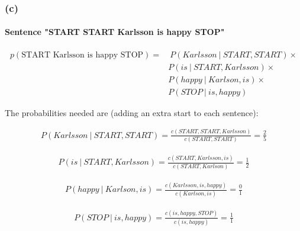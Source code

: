 \documentclass{article}
\newcommand\given[1][]{\:#1\vert\:}
\begin{document}
\subsubsection*{(c)}

\paragraph{Sentence "START START Karlsson is happy STOP"}

\begin{equation*}
    \begin{split}
    p(\text{START Karlsson is happy STOP}) =&\ P(Karlsson \given START, START) \times \\
    & P(is \given START, Karlsson) \times \\
    & P(happy \given Karlson, is) \times \\
    & P(STOP \given is, happy)
    \end{split}
\end{equation*}

The probabilities needed are (adding an extra start to each sentence):

\begin{equation*}
    \begin{split}
    P(Karlsson \given START, START) = \frac{c(START, START, Karlsson)}{ c(START, START)} = \frac{2}{5}
    \end{split}
\end{equation*}

\begin{equation*}
    \begin{split}
    P(is \given START, Karlsson) = \frac{c(START, Karlsson, is)}{ c(START, Karlson)} = \frac{1}{2}
    \end{split}
\end{equation*}

\begin{equation*}
    \begin{split}
    P(happy \given Karlson, is) = \frac{c(Karlsson, is, happy)}{ c(Karlson, is)} = \frac{0}{1}
    \end{split}
\end{equation*}

\begin{equation*}
    \begin{split}
    P(STOP \given is, happy) = \frac{c(is, happy, STOP)}{c(is, happy)} = \frac{1}{1}
    \end{split}
\end{equation*}
\end{document}
